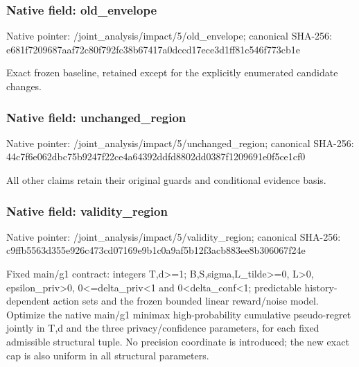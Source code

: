 \documentclass[10pt,a4paper]{article}
\begin{document}
\subsubsection{Native field: old\_\allowbreak{}envelope}
Native pointer: /joint\_\allowbreak{}analysis/impact/5/old\_\allowbreak{}envelope; canonical SHA-256: e681f7209687aaf72c80f792fc38b67417a0dccd17ece3d1ff81c546f773cb1e

\begingroup\raggedright\sloppy Exact frozen baseline,\allowbreak{} retained except for the explicitly enumerated candidate changes.\par\endgroup

\subsubsection{Native field: unchanged\_\allowbreak{}region}
Native pointer: /joint\_\allowbreak{}analysis/impact/5/unchanged\_\allowbreak{}region; canonical SHA-256: 44c7f6e062dbc75b9247f22ce4a64392ddfd8802dd0387f1209691e0f5ce1cf0

\begingroup\raggedright\sloppy All other claims retain their original guards and conditional evidence basis.\par\endgroup

\subsubsection{Native field: validity\_\allowbreak{}region}
Native pointer: /joint\_\allowbreak{}analysis/impact/5/validity\_\allowbreak{}region; canonical SHA-256: c9ffb5563d355e926c473cd07169e9b1c0a9af5b12f3acb883ee8b306067f24e

\begingroup\raggedright\sloppy Fixed main/\allowbreak{}g1 contract:\allowbreak{} integers T,\allowbreak{}d>=\allowbreak{}1;\allowbreak{} B,\allowbreak{}S,\allowbreak{}sigma,\allowbreak{}L\_\allowbreak{}tilde>=\allowbreak{}0,\allowbreak{} L>0,\allowbreak{} epsilon\_\allowbreak{}priv>0,\allowbreak{} 0<=\allowbreak{}delta\_\allowbreak{}priv<1 and 0<delta\_\allowbreak{}conf<1;\allowbreak{} predictable history-dependent action sets and the frozen bounded linear reward/\allowbreak{}noise model. Optimize the native main/\allowbreak{}g1 minimax high-probability cumulative pseudo-regret jointly in T,\allowbreak{}d and the three privacy/\allowbreak{}confidence parameters,\allowbreak{} for each fixed admissible structural tuple. No precision coordinate is introduced;\allowbreak{} the new exact cap is also uniform in all structural parameters.\par\endgroup
\end{document}
